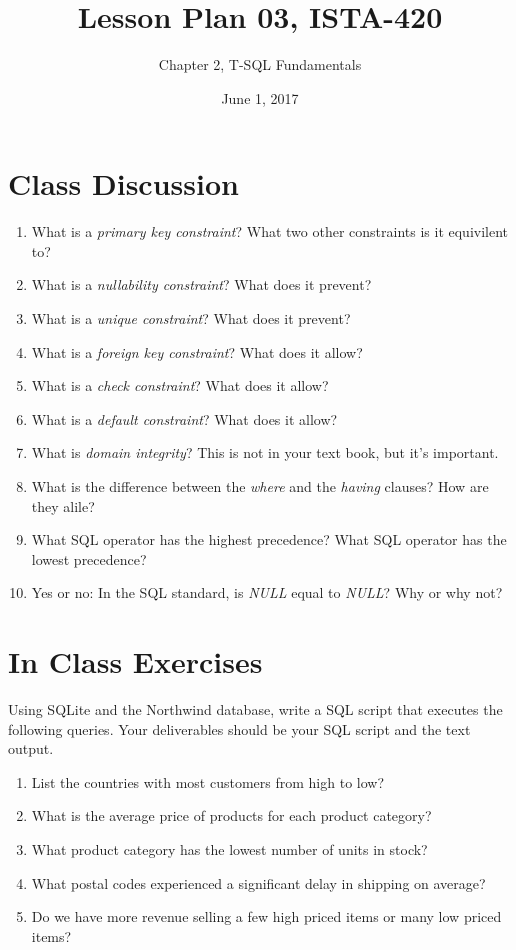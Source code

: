 \documentclass{article}
\title{Lesson Plan 03, ISTA-420}
\author{Chapter 2, T-SQL Fundamentals}
\date{June 1, 2017}
\begin{document}
    

    \maketitle{}

    \section{Class Discussion}

    \begin{enumerate}

        \item What is a \textit{primary key constraint}? What two other constraints is it equivilent to?
        \item What is a \textit{nullability constraint}? What does it prevent?
        \item What is a \textit{unique constraint}? What does it prevent?
        \item What is a \textit{foreign key constraint}? What does it allow?
        \item What is a \textit{check constraint}? What does it allow?
        \item What is a \textit{default constraint}? What does it allow?
        \item What is \textit{domain integrity}? This is not in your text book, but it's important.
        \item What is the difference between the \textit{where} and the \textit{having} clauses? How are they alile?
        \item What SQL operator has the highest precedence? What SQL operator has the lowest precedence?
        \item Yes or no: In the SQL standard, is \textit{NULL} equal to  \textit{NULL}? Why or why not?



    \end{enumerate}


    \section{In Class Exercises}

Using SQLite and the Northwind database, write a SQL script that executes the following queries. Your deliverables should be your SQL script and the text output.

    \begin{enumerate}
\item List the countries with most customers from high to low?
\item What is the average price of products for each product category?
\item What product category has the lowest number of units in stock?
\item What postal codes experienced a significant delay in shipping on average?
\item Do we have more revenue selling a few high priced items or many low priced items?
    
    \end{enumerate}
\end{document}
